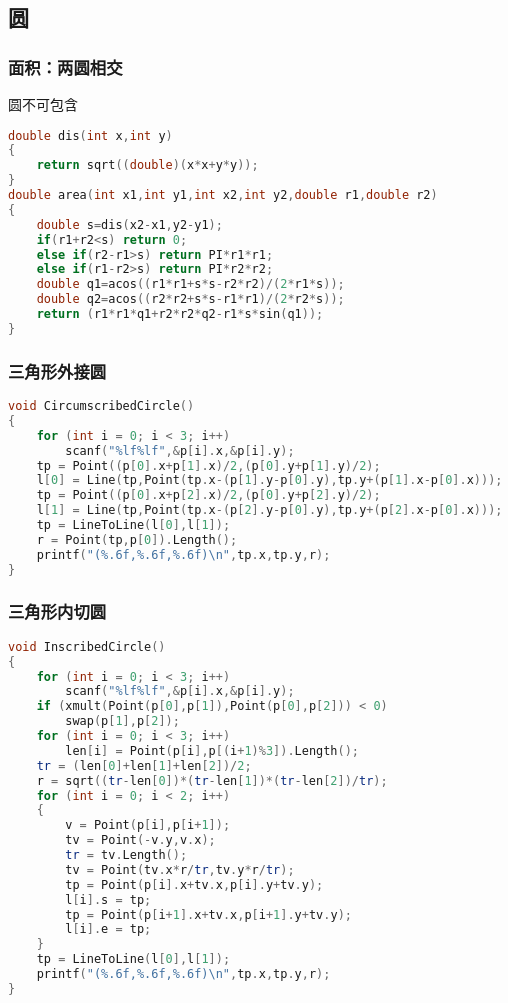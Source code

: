 \subsection{圆}    
    \subsubsection{面积：两圆相交}
	圆不可包含
	\begin{lstlisting}[language=c++]
double dis(int x,int y)
{
    return sqrt((double)(x*x+y*y));
}
double area(int x1,int y1,int x2,int y2,double r1,double r2)
{
    double s=dis(x2-x1,y2-y1);
    if(r1+r2<s) return 0;
    else if(r2-r1>s) return PI*r1*r1;
    else if(r1-r2>s) return PI*r2*r2;
    double q1=acos((r1*r1+s*s-r2*r2)/(2*r1*s));
    double q2=acos((r2*r2+s*s-r1*r1)/(2*r2*s));
    return (r1*r1*q1+r2*r2*q2-r1*s*sin(q1));
}
	\end{lstlisting}
	
    \subsubsection{三角形外接圆}
	\begin{lstlisting}[language=c++]
void CircumscribedCircle()
{
    for (int i = 0; i < 3; i++)
        scanf("%lf%lf",&p[i].x,&p[i].y);
    tp = Point((p[0].x+p[1].x)/2,(p[0].y+p[1].y)/2);
    l[0] = Line(tp,Point(tp.x-(p[1].y-p[0].y),tp.y+(p[1].x-p[0].x)));
    tp = Point((p[0].x+p[2].x)/2,(p[0].y+p[2].y)/2);
    l[1] = Line(tp,Point(tp.x-(p[2].y-p[0].y),tp.y+(p[2].x-p[0].x)));
    tp = LineToLine(l[0],l[1]);
    r = Point(tp,p[0]).Length();
    printf("(%.6f,%.6f,%.6f)\n",tp.x,tp.y,r);
}
	\end{lstlisting}
	
    \subsubsection{三角形内切圆}
	\begin{lstlisting}[language=c++]
void InscribedCircle()
{
    for (int i = 0; i < 3; i++)
        scanf("%lf%lf",&p[i].x,&p[i].y);
    if (xmult(Point(p[0],p[1]),Point(p[0],p[2])) < 0)
        swap(p[1],p[2]);
    for (int i = 0; i < 3; i++)
        len[i] = Point(p[i],p[(i+1)%3]).Length();
    tr = (len[0]+len[1]+len[2])/2;
    r = sqrt((tr-len[0])*(tr-len[1])*(tr-len[2])/tr);
    for (int i = 0; i < 2; i++)
    {
        v = Point(p[i],p[i+1]);
        tv = Point(-v.y,v.x);
        tr = tv.Length();
        tv = Point(tv.x*r/tr,tv.y*r/tr);
        tp = Point(p[i].x+tv.x,p[i].y+tv.y);
        l[i].s = tp;
        tp = Point(p[i+1].x+tv.x,p[i+1].y+tv.y);
        l[i].e = tp;
    }
    tp = LineToLine(l[0],l[1]);
    printf("(%.6f,%.6f,%.6f)\n",tp.x,tp.y,r);
}
	\end{lstlisting}
	
